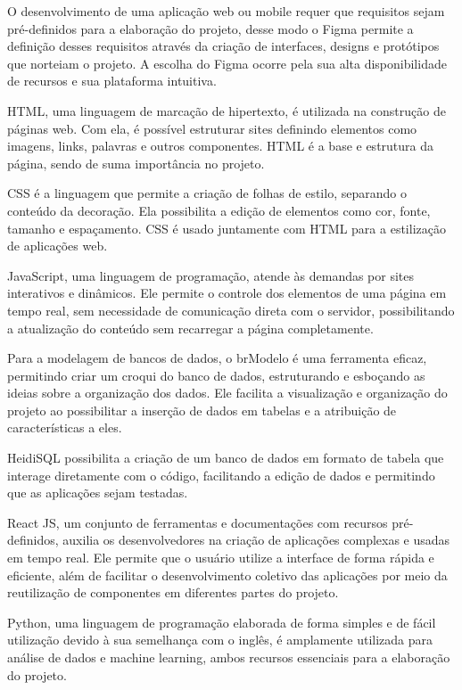 O desenvolvimento de uma aplicação web ou mobile requer que requisitos sejam pré-definidos para a elaboração do projeto, desse modo o Figma permite a definição desses requisitos através da criação de interfaces, designs e protótipos que norteiam o projeto. A escolha do Figma ocorre pela sua alta disponibilidade de recursos e  sua plataforma intuitiva. 

HTML, uma linguagem de marcação de hipertexto, é utilizada na construção de páginas web. Com ela, é possível estruturar sites definindo elementos como imagens, links, palavras e outros componentes. HTML é a base e estrutura da página, sendo de suma importância no projeto.

CSS é a linguagem que permite a criação de folhas de estilo, separando o conteúdo da decoração. Ela possibilita a edição de elementos como cor, fonte, tamanho e espaçamento. CSS é usado juntamente com HTML para a estilização de aplicações web.

JavaScript, uma linguagem de programação, atende às demandas por sites interativos e dinâmicos. Ele permite o controle dos elementos de uma página em tempo real, sem necessidade de comunicação direta com o servidor, possibilitando a atualização do conteúdo sem recarregar a página completamente.

Para a modelagem de bancos de dados, o brModelo é uma ferramenta eficaz, permitindo criar um croqui do banco de dados, estruturando e esboçando as ideias sobre a organização dos dados. Ele facilita a visualização e organização do projeto ao possibilitar a inserção de dados em tabelas e a atribuição de características a eles.

HeidiSQL possibilita a criação de um banco de dados em formato de tabela que interage diretamente com o código, facilitando a edição de dados e permitindo que as aplicações sejam testadas.

React JS, um conjunto de ferramentas e documentações com recursos pré-definidos, auxilia os desenvolvedores na criação de aplicações complexas e usadas em tempo real. Ele permite que o usuário utilize a interface de forma rápida e eficiente, além de facilitar o desenvolvimento coletivo das aplicações por meio da reutilização de componentes em diferentes partes do projeto.

Python, uma linguagem de programação elaborada de forma simples e de fácil utilização devido à sua semelhança com o inglês, é amplamente utilizada para análise de dados e machine learning, ambos recursos essenciais para a elaboração do projeto.

